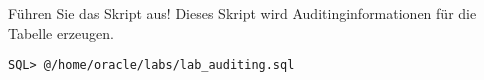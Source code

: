     \item Führen Sie das Skript  aus! Dieses Skript wird Auditinginformationen für die Tabelle  erzeugen.
    \begin{lstlisting}[language=terminal]
SQL> @/home/oracle/labs/lab_auditing.sql
    \end{lstlisting}
